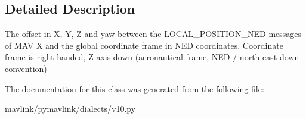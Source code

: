 \subsection{Detailed Description}
\begin{DoxyVerb}The offset in X, Y, Z and yaw between the LOCAL_POSITION_NED
messages of MAV X and the global coordinate frame in NED
coordinates. Coordinate frame is right-handed, Z-axis down
(aeronautical frame, NED / north-east-down convention)
\end{DoxyVerb}
 

The documentation for this class was generated from the following file\+:\begin{DoxyCompactItemize}
\item 
mavlink/pymavlink/dialects/v10.\+py\end{DoxyCompactItemize}
